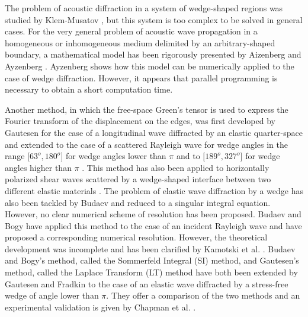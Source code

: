 The problem of acoustic diffraction in a system of wedge-shaped regions was studied by Klem-Musatov \cite{Klem-Musatov}, but this system is too complex to be solved in general cases. For the very general problem of acoustic wave propagation in a homogeneous or inhomogeneous medium delimited by an arbitrary-shaped boundary, a mathematical model has been rigorously presented by Aizenberg and Ayzenberg \cite{Aizenberg}. Ayzenberg \cite{Ayzenberg} shows how this model can be numerically applied to the case of wedge diffraction. However, it appears that parallel programming is necessary to obtain a short computation time.

Another method, in which the free-space Green's tensor is used to express the Fourier transform of the displacement on the edges, was first developed by Gautesen for the case of a longitudinal wave diffracted by an elastic quarter-space \cite{GautesenL4} and extended to the case of a scattered Rayleigh wave for wedge angles in the range $\lbrack 63^o, 180^o \rbrack$ for wedge angles lower than $\pi$ \cite{GautesenRayleigh3,GautesenRayleigh} and to $\lbrack 189^o, 327^o \rbrack$ for wedge angles higher than $\pi$ \cite{GautesenRayleigh2}. This method has also been applied to horizontally polarized shear waves scattered by a wedge-shaped interface between two different elastic materials \cite{GautesenSH}. The problem of elastic wave diffraction by a wedge has also been tackled by Budaev \cite{Budaev,BudaevInclusion,BudaevBook} and reduced to a singular integral equation. However, no clear numerical scheme of resolution has been proposed. Budaev and Bogy \cite{Rayleigh} have applied this method to the case of an incident Rayleigh wave and have proposed a corresponding numerical resolution. However, the theoretical development was incomplete and has been clarified by Kamotski et al. \cite{KamotskiFradkin}. Budaev and Bogy's method, called the Sommerfeld Integral (SI) method, and Gautesen's method, called the Laplace Transform (LT) method have both been extended by Gautesen and Fradkin \cite{GautesenFradkin} to the case of an elastic wave diffracted by a stress-free wedge of angle lower than $\pi$. They offer a comparison of the two methods and an experimental validation is given by Chapman et al. \cite{ChapmanBurch}.

